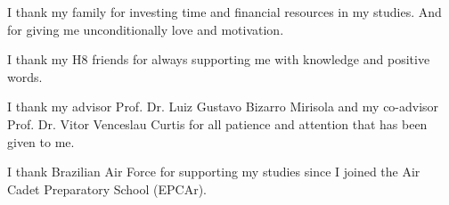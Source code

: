 I thank my family for investing time and financial resources in my studies. And for giving me unconditionally love and motivation.

I thank my H8 friends for always supporting me with knowledge and positive words.

I thank my advisor Prof. Dr. Luiz Gustavo Bizarro Mirisola and my co-advisor Prof. Dr. Vitor Venceslau Curtis for all patience and attention that has been given to me.

I thank Brazilian Air Force for supporting my studies since I joined the Air Cadet Preparatory School (EPCAr).
